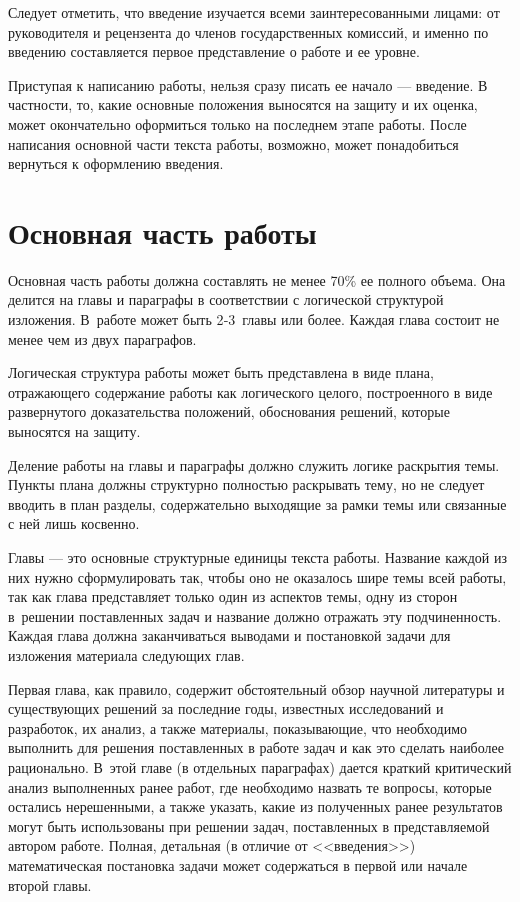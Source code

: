 \documentclass[PI,VKR]{HSEUniversity}
\begin{document}
Следует отметить, что введение изучается всеми заинтересованными лицами: от руководителя и рецензента до членов государственных комиссий, 
и именно по введению составляется первое представление о работе и ее уровне.

Приступая к написанию работы, нельзя сразу писать ее начало --- введение.
В частности, то, какие основные положения выносятся на защиту и их оценка, может окончательно оформиться только на последнем этапе работы. После написания основной части текста работы, возможно, может понадобиться вернуться к оформлению введения. 

\chapter{Основная часть работы}

Основная часть работы должна составлять не менее 70\% ее полного объема. Она делится на главы и параграфы в соответствии с логической структурой изложения. В работе может быть 2‑3 главы или более. Каждая глава состоит не менее чем из двух параграфов.

Логическая структура работы может быть представлена в виде плана, отражающего содержание работы как логического целого, построенного в виде развернутого доказательства положений, обоснования решений, которые выносятся на защиту.

Деление работы на главы и параграфы должно служить логике раскрытия темы. Пункты плана должны структурно полностью раскрывать тему, но не следует вводить в план разделы, содержательно выходящие за рамки темы или связанные с ней лишь косвенно.

Главы --- это основные структурные единицы текста работы. Название каждой из них нужно сформулировать так, чтобы оно не оказалось шире темы всей работы, так как глава представляет только один из аспектов темы, одну из сторон в решении поставленных задач и название должно отражать эту подчиненность.
Каждая глава должна заканчиваться выводами и постановкой задачи для изложения материала следующих глав.

Первая глава, как правило, содержит обстоятельный обзор научной литературы и существующих решений за последние годы, известных исследований и разработок, их анализ, а также материалы, показывающие, что необходимо выполнить для решения поставленных в работе задач и как это сделать наиболее рационально. В этой главе (в отдельных параграфах) дается краткий критический анализ выполненных ранее работ, где необходимо назвать те вопросы, которые остались нерешенными, а также указать, какие из полученных ранее результатов могут быть использованы при решении задач, поставленных в представляемой автором работе. Полная, детальная (в отличие от <<введения>>) математическая постановка задачи может содержаться в первой или начале второй главы.
\end{document}
